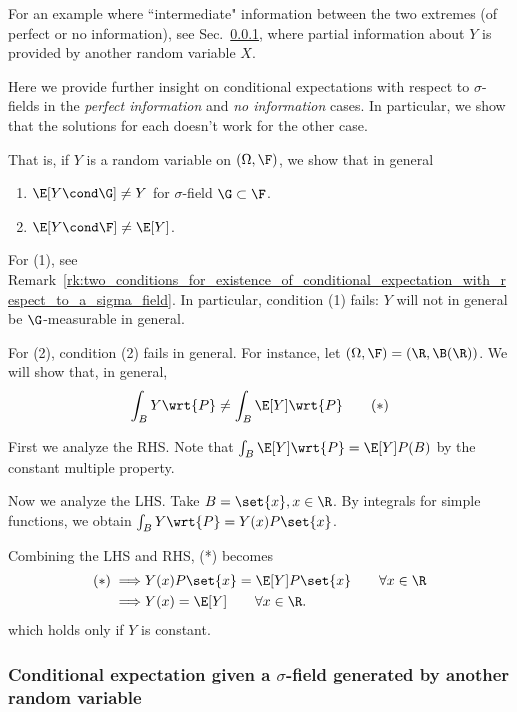 \documentclass{article} %
\begin{document}
\begin{remark}
For an example where ``intermediate" information between the two extremes (of perfect or no information), see Sec.~\ref{sec:conditional_expectation_wrt_a_sigma_field_induced_by_another_random_variable}, where partial information about $Y$ is provided by another random variable $X$.	
\end{remark}


\begin{remark}
Here we provide further insight on conditional expectations with respect to $\sigma$-fields in the \textit{perfect information} and \textit{no information} cases.  In particular, we show that the solutions for each doesn't work for the other case. 

That is, if $Y$ is a random variable on $(\Omega, \F)$, we show that in general
\begin{enumerate}
	\item $\E[Y \cond \G] \neq Y$ for $\sigma$-field $\G \subset \F$. 
	\item $\E[Y \cond \F] \neq \E[Y]$.
\end{enumerate}
For (1), see Remark~\ref{rk:two_conditions_for_existence_of_conditional_expectation_with_respect_to_a_sigma_field}.  In particular, condition (1) fails: $Y$ will not in general be $\G$-measurable in general.

For (2), condition (2) fails in general.  For instance, let $(\Omega, \F)=(\R, \B(\R))$.  We will show that, in general,
\[ \int_B Y \wrt{P} \neq \int_B \E[Y] \wrt{P} \quad \quad (*) \]  

First we analyze the RHS.  Note that $\int_B \E[Y] \wrt{P} = \E[Y] P(B)$ by the constant multiple property. 

Now we analyze the LHS. Take $B=\set{x}, x \in \R$.  By integrals for simple functions, we obtain $\int_B Y \wrt{P} = Y(x) P\set{x}$.

Combining the LHS and RHS, (*) becomes 
\begin{align*}
(*) \implies & Y(x) P\set{x} = \E[Y] P\set{x} \quad \quad \forall x \in \R \\
\implies  & Y(x)= \E[Y]  \quad \quad  \forall x \in \R.	
\end{align*}
which holds only if $Y$ is constant.

\end{remark}

\subsubsection{Conditional expectation given a $\sigma$-field generated by another random variable}  \label{sec:conditional_expectation_wrt_a_sigma_field_induced_by_another_random_variable}
\end{document}
